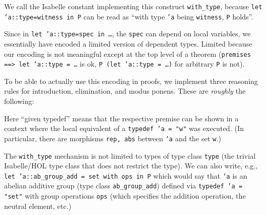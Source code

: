 \documentclass[11pt,a4paper]{article}
\begin{document}
We call the Isabelle constant implementing this construct \texttt{with\_type}, because \texttt{let 'a::type=witness in P} can be read as ``with type \texttt{'a} being \texttt{witness}, \texttt{P} holds''.

Since in \texttt{let 'a::type=spec in \dots}, the \texttt{spec} can depend on local variables,
we essentially have encoded a limited version of dependent types.
Limited because our encoding is not meaningful except at the top level of a theorem (\texttt{premises ==> let 'a::type = \dots} is ok, \texttt{P (let 'a::type = \dots)} for arbitrary \texttt{P} is not).

To be able to actually use this encoding in proofs, we implement three reasoning rules for introduction, elimination, and modus ponens.
These are \emph{roughly} the following:
\begin{center}\strut
  \qquad\qquad

  \bigskip
  
\strut{}
\end{center}
Here ``given typedef'' means that the respective premise can be shown in a context where
the local equivalent of a \texttt{typedef 'a = "w"} was executed.
(In particular, there are morphisms \texttt{rep, abs} between \texttt{'a} and the set \texttt{w}.)

\bigskip

The \texttt{with\_type} mechanism is not limited to types of type class \texttt{type}
(the trivial Isabelle/HOL type class that does not restrict the type).
We can also write, e.g., \texttt{let 'a::ab\_group\_add = set with ops in P} which would say that \texttt{'a} is an abelian additive group (type class \texttt{ab\_group\_add}) defined via \texttt{typedef 'a = "set"} with group operations \texttt{ops} (which specifies the addition operation, the neutral element, etc.)




%
%
\end{document}
